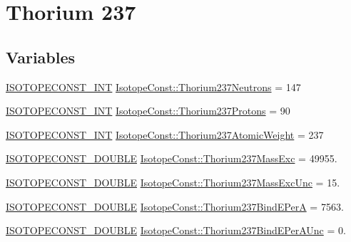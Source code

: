 \hypertarget{group___isotope_const-_thorium-_th237}{}\section{Thorium 237}
\label{group___isotope_const-_thorium-_th237}
\subsection*{Variables}
\begin{DoxyCompactItemize}
\item 
\mbox{\hyperlink{group___isotope_const-_macros_ga5f18360b3e99483a35c32d789e62621c}{I\+S\+O\+T\+O\+P\+E\+C\+O\+N\+S\+T\+\_\+\+I\+NT}} \mbox{\hyperlink{group___isotope_const-_thorium-_th237_gae7f2a05bb2d080819481b5b0d2c75015}{Isotope\+Const\+::\+Thorium237\+Neutrons}} = 147
\item 
\mbox{\hyperlink{group___isotope_const-_macros_ga5f18360b3e99483a35c32d789e62621c}{I\+S\+O\+T\+O\+P\+E\+C\+O\+N\+S\+T\+\_\+\+I\+NT}} \mbox{\hyperlink{group___isotope_const-_thorium-_th237_gadb61c1d19c7e4119a329e3f3829a2f81}{Isotope\+Const\+::\+Thorium237\+Protons}} = 90
\item 
\mbox{\hyperlink{group___isotope_const-_macros_ga5f18360b3e99483a35c32d789e62621c}{I\+S\+O\+T\+O\+P\+E\+C\+O\+N\+S\+T\+\_\+\+I\+NT}} \mbox{\hyperlink{group___isotope_const-_thorium-_th237_gaaef1d3b3b532ec40e3a5c68d6508cbda}{Isotope\+Const\+::\+Thorium237\+Atomic\+Weight}} = 237
\item 
\mbox{\hyperlink{group___isotope_const-_macros_ga8f45a7272ce02c0b4c65c44636ed719a}{I\+S\+O\+T\+O\+P\+E\+C\+O\+N\+S\+T\+\_\+\+D\+O\+U\+B\+LE}} \mbox{\hyperlink{group___isotope_const-_thorium-_th237_ga22311d89bff603b88a4f6ce8c8190f82}{Isotope\+Const\+::\+Thorium237\+Mass\+Exc}} = 49955.
\item 
\mbox{\hyperlink{group___isotope_const-_macros_ga8f45a7272ce02c0b4c65c44636ed719a}{I\+S\+O\+T\+O\+P\+E\+C\+O\+N\+S\+T\+\_\+\+D\+O\+U\+B\+LE}} \mbox{\hyperlink{group___isotope_const-_thorium-_th237_ga3b8efcedb1d5115a5d8c84bbfb797f8a}{Isotope\+Const\+::\+Thorium237\+Mass\+Exc\+Unc}} = 15.
\item 
\mbox{\hyperlink{group___isotope_const-_macros_ga8f45a7272ce02c0b4c65c44636ed719a}{I\+S\+O\+T\+O\+P\+E\+C\+O\+N\+S\+T\+\_\+\+D\+O\+U\+B\+LE}} \mbox{\hyperlink{group___isotope_const-_thorium-_th237_gaf63b6b344b200adcb5aaf6c76a8fd881}{Isotope\+Const\+::\+Thorium237\+Bind\+E\+PerA}} = 7563.
\item 
\mbox{\hyperlink{group___isotope_const-_macros_ga8f45a7272ce02c0b4c65c44636ed719a}{I\+S\+O\+T\+O\+P\+E\+C\+O\+N\+S\+T\+\_\+\+D\+O\+U\+B\+LE}} \mbox{\hyperlink{group___isotope_const-_thorium-_th237_gacb2031e9c48bc22b424c719e66287dcc}{Isotope\+Const\+::\+Thorium237\+Bind\+E\+Per\+A\+Unc}} = 0.

\end{DoxyCompactItemize}
